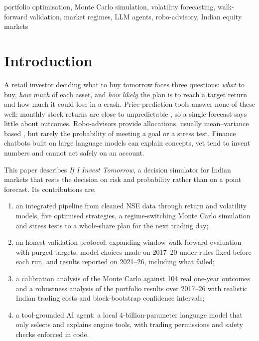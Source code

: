 \documentclass[conference]{IEEEtran}
\begin{document}
\begin{IEEEkeywords}
portfolio optimisation, Monte Carlo simulation, volatility forecasting, walk-forward validation, market regimes, LLM agents, robo-advisory, Indian equity markets
\end{IEEEkeywords}

\section{Introduction}
A retail investor deciding what to buy tomorrow faces three questions: \emph{what} to buy, \emph{how much} of each asset, and \emph{how likely} the plan is to reach a target return and how much it could lose in a crash. Price-prediction tools answer none of these well: monthly stock returns are close to unpredictable \cite{gu2020}, so a single forecast says little about outcomes. Robo-advisors provide allocations, usually mean--variance based \cite{beketov2018}, but rarely the probability of meeting a goal or a stress test. Finance chatbots built on large language models can explain concepts, yet tend to invent numbers and cannot act safely on an account.

This paper describes \emph{If I Invest Tomorrow}, a decision simulator for Indian markets that rests the decision on risk and probability rather than on a point forecast. Its contributions are:
\begin{enumerate}
\item an integrated pipeline from cleaned NSE data through return and volatility models, five optimised strategies, a regime-switching Monte Carlo simulation and stress tests to a whole-share plan for the next trading day;
\item an honest validation protocol: expanding-window walk-forward evaluation with purged targets, model choices made on 2017--20 under rules fixed before each run, and results reported on 2021--26, including what failed;
\item a calibration analysis of the Monte Carlo against 104 real one-year outcomes and a robustness analysis of the portfolio results over 2017--26 with realistic Indian trading costs and block-bootstrap confidence intervals;
\item a tool-grounded AI agent: a local 4-billion-parameter language model that only selects and explains engine tools, with trading permissions and safety checks enforced in code.
\end{enumerate}
\end{document}
